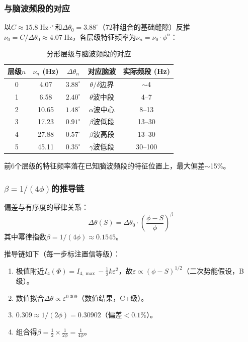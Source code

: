 \subsubsection{与脑波频段的对应}

以$C \approx 15.8\;\text{Hz}\cdot^\circ$和$\Delta\theta_0 = 3.88^\circ$（72种组合的基础缝隙）反推$\nu_0 = C/\Delta\theta_0 \approx 4.07\;\text{Hz}$，各层级特征频率为$\nu_n = \nu_0 \cdot \phi^n$：

\begin{table}[htbp]
\centering
\caption{分形层级与脑波频段的对应}
\label{tab:brain_waves}
\begin{tabular}{ccccc}
\hline
层级$n$ & $\nu_n$ (Hz) & $\Delta\theta_n$ & 对应脑波 & 实际频段 (Hz) \\
\hline
0 & 4.07 & $3.88^\circ$ & $\theta/\delta$边界 & $\sim$4 \\
1 & 6.58 & $2.40^\circ$ & $\theta$波中段 & 4--7 \\
2 & 10.65 & $1.48^\circ$ & $\alpha$波中心 & 8--13 \\
3 & 17.23 & $0.91^\circ$ & $\beta$波低段 & 13--30 \\
4 & 27.88 & $0.57^\circ$ & $\beta$波高段 & 13--30 \\
5 & 45.11 & $0.35^\circ$ & $\gamma$波低段 & 30--100 \\
\hline
\end{tabular}
\end{table}

前6个层级的特征频率落在已知脑波频段的特征位置上，最大偏差$\sim$15\%。

\subsubsection{$\beta = 1/(4\phi)$的推导链}

\begin{conjecture}
\label{conj:beta}
偏差与有序度的幂律关系：
\begin{equation}
\Delta\theta(S) = \Delta\theta_0 \cdot \left(\frac{\phi - S}{\phi}\right)^{\beta}
\label{eq:beta_scaling}
\end{equation}
其中幂律指数$\beta = 1/(4\phi) \approx 0.1545$。
\end{conjecture}

推导链如下（每一步标注置信等级）：
\begin{enumerate}
\item 极值附近$I_4(\Phi) = I_{4,\max} - \frac{1}{2}k\varepsilon^2$，故$\varepsilon \propto (\phi - S)^{1/2}$（二次势能假设，B级）。
\item 数值拟合$\Delta\theta \propto \varepsilon^{0.309}$（数值结果，C+级）。
\item $0.309 \approx 1/(2\phi) = 0.30902$（偏差$<0.1\%$）。
\item 组合得$\beta = \frac{1}{2} \times \frac{1}{2\phi} = \frac{1}{4\phi}$。
\end{enumerate}

